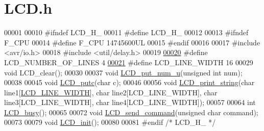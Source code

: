 \hypertarget{_l_c_d_8h_source}{}\section{L\+C\+D.\+h}
\label{_l_c_d_8h_source}

\begin{DoxyCode}
00001 
00010 \textcolor{preprocessor}{#ifndef LCD\_H\_}
00011 \textcolor{preprocessor}{#define LCD\_H\_}
00012 
00013 \textcolor{preprocessor}{#ifndef F\_CPU}
00014 \textcolor{preprocessor}{#define F\_CPU 14745600UL}
00015 \textcolor{preprocessor}{#endif}
00016 
00017 \textcolor{preprocessor}{#include <avr/io.h>}
00018 \textcolor{preprocessor}{#include <util/delay.h>}
00019 
\hypertarget{_l_c_d_8h_source.tex_l00020}{}\hyperlink{_l_c_d_8h_a5bb24c05980471cbc9086fef965deacc}{00020} \textcolor{preprocessor}{#define LCD\_NUMBER\_OF\_LINES 4 }
\hypertarget{_l_c_d_8h_source.tex_l00021}{}\hyperlink{_l_c_d_8h_a5bdd8750b215c775f2227262a1934b54}{00021} \textcolor{preprocessor}{#define LCD\_LINE\_WIDTH 16 }
00029 \textcolor{preprocessor}{void LCD\_clear();}
00030 
00037 \textcolor{keywordtype}{void} \hyperlink{_l_c_d_8h_ab7c7379b10d76669edf03099f799b357}{LCD\_put\_num\_u}(\textcolor{keywordtype}{unsigned} \textcolor{keywordtype}{int} num);
00038 
00045 \textcolor{keywordtype}{void} \hyperlink{_l_c_d_8h_a7a19aaec7f9deb1589a7efddf3da8d3f}{LCD\_putc}(\textcolor{keywordtype}{char} c);
00046 
00056 \textcolor{keywordtype}{void} \hyperlink{_l_c_d_8h_afbc155e4e9d279ccd12c2695fe78a0e3}{LCD\_print\_string}(\textcolor{keywordtype}{char} line1[\hyperlink{_l_c_d_8h_a5bdd8750b215c775f2227262a1934b54}{LCD\_LINE\_WIDTH}], \textcolor{keywordtype}{char} line2[LCD\_LINE\_WIDTH],
       \textcolor{keywordtype}{char} line3[LCD\_LINE\_WIDTH], \textcolor{keywordtype}{char} line4[LCD\_LINE\_WIDTH]);
00057 
00064 \textcolor{keywordtype}{int} \hyperlink{_l_c_d_8h_a6679ea6f481524d1b6a30c4d99b8aad5}{LCD\_busy}();
00065 
00072 \textcolor{keywordtype}{void} \hyperlink{_l_c_d_8h_aa6d8c104e37eef62ba3a6046d1333ca6}{LCD\_send\_command}(\textcolor{keywordtype}{unsigned} \textcolor{keywordtype}{char} command);
00073 
00079 \textcolor{keywordtype}{void} \hyperlink{_l_c_d_8h_a0742e25c23ca1096ceba081b98fd58ba}{LCD\_init}();
00080 
00081 \textcolor{preprocessor}{#endif }\textcolor{comment}{/* LCD\_H\_ */}\textcolor{preprocessor}{}
\end{DoxyCode}
